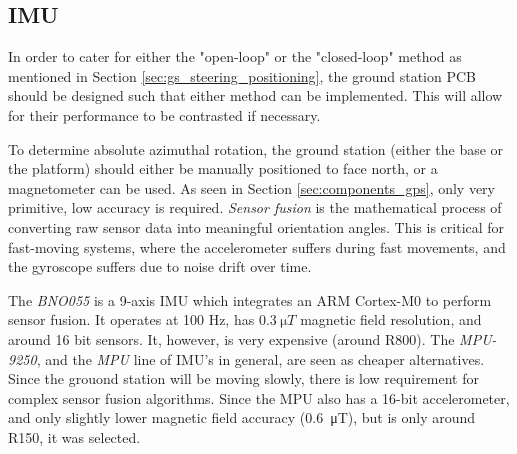 \subsection{IMU}
In order to cater for either the "open-loop" or the "closed-loop" method as mentioned in Section \ref{sec:gs_steering_positioning}, the ground station PCB should be designed such that either method can be implemented. This will allow for their performance to be contrasted if necessary.

To determine absolute azimuthal rotation, the ground station (either the base or the platform) should either be manually positioned to face north, or a magnetometer can be used. As seen in Section \ref{sec:components_gps}, only very primitive, low accuracy is required. \textit{Sensor fusion} is the mathematical process of converting raw sensor data into meaningful orientation angles. This is critical for fast-moving systems, where the accelerometer suffers during fast movements, and the gyroscope suffers due to noise drift over time.

The \textit{BNO055} is a 9-axis IMU which integrates an ARM Cortex-M0 to perform sensor fusion. It operates at 100 Hz, has $\SI{0.3}{\micro T}$ magnetic field resolution, and around 16 bit sensors. It, however, is very expensive (around R800). The \textit{MPU-9250}, and the \textit{MPU} line of IMU's in general, are seen as cheaper alternatives. Since the grouond station will be moving slowly, there is low requirement for complex sensor fusion algorithms. Since the MPU also has a 16-bit accelerometer, and only slightly lower magnetic field accuracy (\SI{0.6}{\micro T}), but is only around R150, it was selected.


